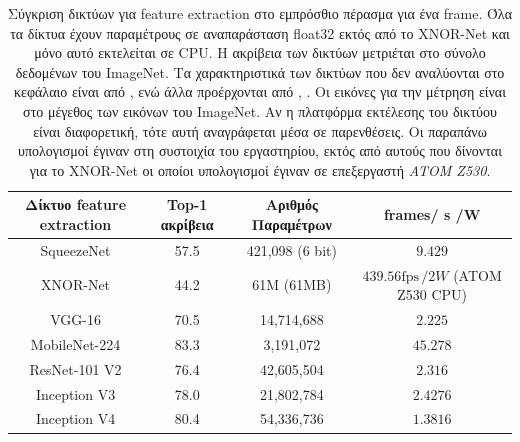 \begin{table}
\centering
\begin{tabular}{c|c|c|c} 
 Δίκτυο feature extraction & Top-1 ακρίβεια & Αριθμός Παραμέτρων & frames/ s /W \\
\hline
SqueezeNet & 57.5 & 421,098 (6 bit) & $ 9.429 $ \\ %
XNOR-Net & 44.2 & 61M (61MB) & $439.56 \text{fps}\, / 2W$ (ATOM Z530 CPU) \\ %
VGG-16 & 70.5 & 14,714,688 & $2.225$ \\ %
MobileNet-224 & 83.3 & 3,191,072 & $45.278$ \\ %
ResNet-101 V2& 76.4 & 42,605,504 & $2.316$ \\ %
Inception V3 & 78.0 & 21,802,784 & $ 2.4276$ \\  %
Inception V4 & 80.4 & 54,336,736 & $ 1.3816$ \\ %
\hline
\end{tabular}
\caption[Σύγκριση δικτύων για feature extraction]{Σύγκριση δικτύων για feature extraction στο εμπρόσθιο πέρασμα για ένα frame. Όλα τα δίκτυα έχουν παραμέτρους σε αναπαράσταση float32 εκτός από το XNOR-Net και μόνο αυτό εκτελείται σε CPU. Η ακρίβεια των δικτύων μετριέται στο σύνολο δεδομένων του ImageNet. Τα χαρακτηριστικά των δικτύων που δεν αναλύονται στο κεφάλαιο είναι από \cite{28}, ενώ άλλα προέρχονται από \cite{29}, 
\cite{30, 31, 32}. Οι εικόνες για την μέτρηση είναι στο μέγεθος των εικόνων του ImageNet. Αν η πλατφόρμα εκτέλεσης του δικτύου είναι διαφορετική, τότε αυτή αναγράφεται μέσα σε παρενθέσεις. Οι παραπάνω υπολογισμοί έγιναν στη συστοιχία του εργαστηρίου, εκτός από αυτούς που δίνονται για το XNOR-Net οι οποίοι υπολογισμοί έγιναν σε επεξεργαστή \textit{ATOM Z530}.}
\label{table:cnnComp}
\end{table}

